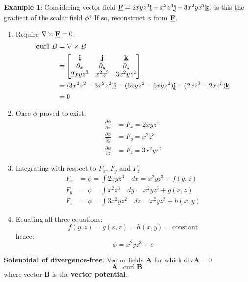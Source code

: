 \documentclass[10pt,a4paper]{article}
\begin{document}
\textbf{Example 1}: Considering vector field
$\textbf{\underline{F}}=2xyz^3\textbf{\underline{i}}+x^2z^3\textbf{\underline{j}}+3x^2yx^2\textbf{\underline{k}}$,
is this the gradient of the scalar field $\phi$? If so, reconstruct $\phi$ from
$\textbf{\underline{F}}$.
\begin{enumerate}
    \item Require $\nabla \times \textbf{\underline{F}}=0$:
    \begin{align*}
        \textbf{curl }B &= \nabla \times B \\
        &= \begin{bmatrix}
            \textbf{\underline{i}} & \textbf{\underline{j}} & \textbf{\underline{k}} \\
            \partial_x & \partial_y & \partial_z \\
            2xyz^3 & x^2z^3 & 3x^2yz^2
        \end{bmatrix} \\
        &= (3x^2z^2-3x^2z^2)\textbf{\underline{i}}-(6xyz^2-6xyz^2)\textbf{\underline{j}}+(2xz^3-2xz^3)\textbf{\underline{k}} \\
        &= 0
    \end{align*}

    \item Once $\phi$ proved to exist:
    \begin{align*}
        \frac{\partial\phi}{\partial x} &= F_x = 2xyz^3 \\
        \frac{\partial\phi}{\partial y} &= F_y = x^2z^3 \\
        \frac{\partial\psi}{\partial z} &= F_z = 3x^2yz^2
    \end{align*}
    
    \item Integrating with respect to $F_x$, $F_y$ and $F_z$
    \begin{align*}
        F_x &= \phi = \int 2xyz^3 \quad dx = x^2yz^3 + f(y,z) \\
        F_y &= \phi = \int x^2z^3 \quad dy = x^2yz^3 + g(x,z) \\
        F_z &= \phi = \int 3x^2yz^2 \quad dz = x^2yz^3 + h(x,y)
    \end{align*}

    \item Equating all three equations:
    $$
        f(y,z)=g(x,z)=h(x,y) = \text{constant}
    $$
    hence:
    $$
        \phi = x^2yz^3 + c
    $$
\end{enumerate}

\begin{tcolorbox}[breakable,colback=white]
\textbf{Solenoidal of divergence-free}: Vector fields $\textbf{A}$ for which $\text{div
}\textbf{A}=0$
$$
    \textbf{A} = \text{curl }\textbf{B}
$$
where vector $\textbf{B}$ is the \textbf{vector potential}.
\end{tcolorbox}
\end{document}
